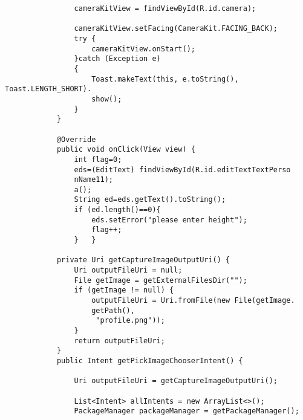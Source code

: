 \documentclass[a4paper,12pt,toc=flat]{report}
\begin{document}
{{{{\begin{itemize}
\begin{verbatim}
 				cameraKitView = findViewById(R.id.camera);
 				
 				cameraKitView.setFacing(CameraKit.FACING_BACK);
 				try {
 					cameraKitView.onStart();
 				}catch (Exception e)
 				{
 					Toast.makeText(this, e.toString(), Toast.LENGTH_SHORT).
 					show();
 				}
 			}
 			
 			@Override
 			public void onClick(View view) {
 				int flag=0;
 				eds=(EditText) findViewById(R.id.editTextTextPerso
 				nName11);
 				a();
 				String ed=eds.getText().toString();
 				if (ed.length()==0){
 					eds.setError("please enter height");
 					flag++;
 				}	}
 			
 			private Uri getCaptureImageOutputUri() {
 				Uri outputFileUri = null;
 				File getImage = getExternalFilesDir("");
 				if (getImage != null) {
 					outputFileUri = Uri.fromFile(new File(getImage.
 					getPath(),
 					 "profile.png"));
 				}
 				return outputFileUri;
 			}
 			public Intent getPickImageChooserIntent() {
 				
 				Uri outputFileUri = getCaptureImageOutputUri();
 				
 				List<Intent> allIntents = new ArrayList<>();
 				PackageManager packageManager = getPackageManager();
 				

\end{verbatim}
\end{itemize}}}}}
\end{document}
